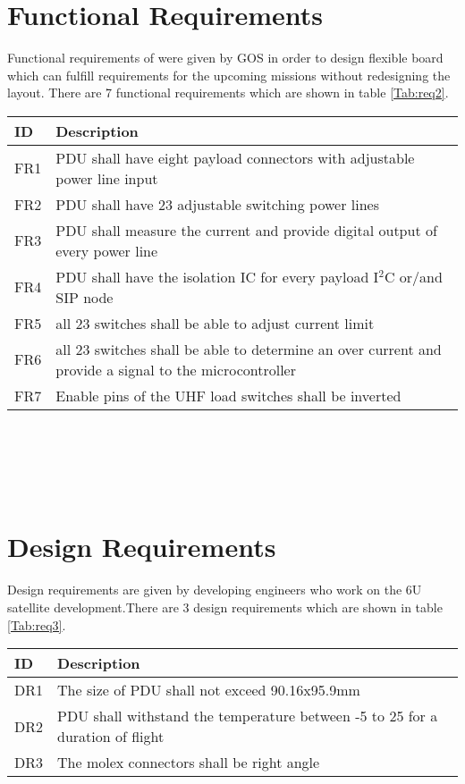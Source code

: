 \section{Functional Requirements}
Functional requirements of were given by GOS in order to design flexible board which can fulfill requirements for the upcoming missions without redesigning the layout. There are 7 functional requirements which are shown in table \ref{Tab:req2}. 
\begin{tabular}{p{1cm}p{13cm}} \toprule
	ID & Description \\ \midrule
FR1 & PDU shall have eight payload connectors with adjustable power line input\\
FR2 & PDU shall have 23 adjustable switching power lines\\
FR3 & PDU shall measure the current and provide digital output of every power line\\
FR4 & PDU shall have the isolation IC for every payload I$^2$C or/and SIP node\\
FR5 &  all 23 switches shall be able to adjust current limit\\
FR6 & all 23 switches shall be able to determine an over current and provide a signal to the microcontroller\\
FR7 & Enable pins of the UHF load switches shall be inverted\\
\bottomrule
\end{tabular}\\ \\ \\ \\
\label{Tab:req2}

\section{Design Requirements}
Design requirements are given by developing engineers who work on the 6U satellite development.There are 3 design requirements which are shown in table \ref{Tab:req3}. 

\begin{tabular}{p{1cm}p{13cm}} \toprule
	ID & Description \\ \midrule
DR1 & The size of PDU shall not exceed 90.16x95.9mm\\
DR2 & PDU shall withstand the temperature between -5 to 25 for a duration of flight\\  
DR3 & The molex connectors shall be right angle\\
\bottomrule
\end{tabular}\\ \\ \\ \\
\label{Tab:req3}




